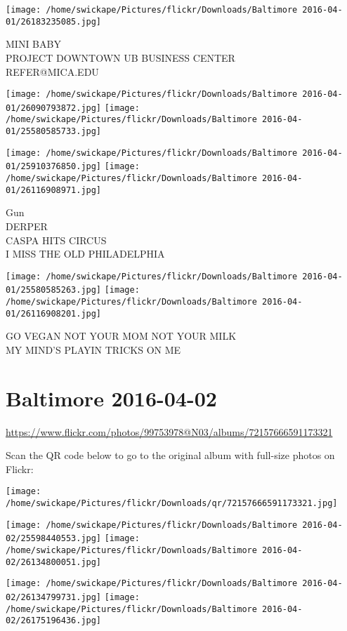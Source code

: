 \documentclass[10pt,letterpaper]{article}
\begin{document}
\vspace{0.25in}
\texttt{[image: /home/swickape/Pictures/flickr/Downloads/Baltimore 2016-04-01/26183235085.jpg]}

MINI BABY\\
PROJECT DOWNTOWN UB BUSINESS CENTER\\
REFER@MICA.EDU
\pagebreak

\texttt{[image: /home/swickape/Pictures/flickr/Downloads/Baltimore 2016-04-01/26090793872.jpg]}
\texttt{[image: /home/swickape/Pictures/flickr/Downloads/Baltimore 2016-04-01/25580585733.jpg]}

\texttt{[image: /home/swickape/Pictures/flickr/Downloads/Baltimore 2016-04-01/25910376850.jpg]}
\texttt{[image: /home/swickape/Pictures/flickr/Downloads/Baltimore 2016-04-01/26116908971.jpg]}

Gun\\
DERPER\\
CASPA HITS CIRCUS\\
I MISS THE OLD PHILADELPHIA
\pagebreak

\texttt{[image: /home/swickape/Pictures/flickr/Downloads/Baltimore 2016-04-01/25580585263.jpg]}
\texttt{[image: /home/swickape/Pictures/flickr/Downloads/Baltimore 2016-04-01/26116908201.jpg]}

GO VEGAN NOT YOUR MOM NOT YOUR MILK\\
MY MIND'S PLAYIN TRICKS ON ME
\pagebreak

\section*{Baltimore 2016-04-02}

\url{https://www.flickr.com/photos/99753978@N03/albums/72157666591173321}

Scan the QR code below to go to the original album with full-size photos on Flickr:

\texttt{[image: /home/swickape/Pictures/flickr/Downloads/qr/72157666591173321.jpg]}
\pagebreak

\texttt{[image: /home/swickape/Pictures/flickr/Downloads/Baltimore 2016-04-02/25598440553.jpg]}
\texttt{[image: /home/swickape/Pictures/flickr/Downloads/Baltimore 2016-04-02/26134800051.jpg]}

\texttt{[image: /home/swickape/Pictures/flickr/Downloads/Baltimore 2016-04-02/26134799731.jpg]}
\texttt{[image: /home/swickape/Pictures/flickr/Downloads/Baltimore 2016-04-02/26175196436.jpg]}
\end{document}
